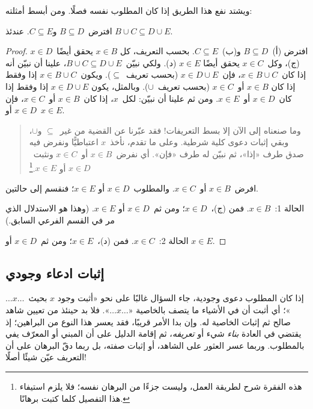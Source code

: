 \documentclass[../../../include/open-logic-section]{subfiles}
\begin{document}
ويشتد نفع هذا الطريق إذا كان المطلوب نفسه فصلًا. ومن أبسط أمثلته:

\begin{prop}
افترض~$B \subseteq D$ و$C \subseteq E$. عندئذ
$B \cup C \subseteq D \cup E$.
\end{prop}

\begin{proof}
  افترض (أ)~$B \subseteq D$ و(ب)~$C \subseteq E$. بحسب التعريف، كل
  $x \in B$ يحقق أيضًا~$x \in D$ (ج)، وكل~$x \in C$ يحقق أيضًا
  $x \in E$ (د). ولكي نبيّن~$B \cup C \subseteq D \cup E$، علينا أن
  نبيّن أنه إذا كان~$x \in B \cup C$، فإن~$x \in D \cup E$ (بحسب
  تعريف~$\subseteq$). ويكون~$x \in B \cup C$ إذا وفقط إذا كان
  $x \in B$ أو~$x \in C$ (بحسب تعريف~$\cup$). وبالمثل، يكون
  $x \in D \cup E$ إذا وفقط إذا كان~$x \in D$ أو~$x \in E$. ومن ثم
  علينا أن نبيّن: لكل~$x$، إذا كان~$x \in B$ أو~$x \in C$، فإن
  $x \in D$ أو~$x \in E$.

  \begin{quote}
  وما صنعناه إلى الآن إلا بسط التعريفات!{} فقد عبّرنا عن القضية من
  غير~$\subseteq$ و$\cup$، وبقي إثبات دعوى كلية شرطية. وعلى ما تقدم،
  نأخذ~$x$ اعتباطيًّا ونفرض فيه صدق طرف «إذا»، ثم نبيّن له طرف «فإن».
  أي نفرض~$x \in B$ أو~$x \in C$ ونثبت~$x \in D$ أو
  $x \in E$.\footnote{هذه الفقرة شرح لطريقة العمل، وليست جزءًا من
  البرهان نفسه؛ فلا يلزم استيفاء هذا التفصيل كلما كتبت برهانًا.}
  \end{quote}

  افرض~$x \in B$ أو~$x \in C$. والمطلوب~$x \in D$ أو
  $x \in E$؛ فنقسم إلى حالتين.

  الحالة 1:~$x \in B$. فمن (ج)،~$x \in D$؛ ومن ثم~$x \in D$ أو
  $x \in E$. (وهذا هو الاستدلال الذي مر في القسم الفرعي السابق.)

  الحالة 2:~$x \in C$. فمن (د)،~$x \in E$؛ ومن ثم~$x \in D$ أو
  $x \in E$.
 \end{proof}


\subsection{إثبات ادعاء وجودي}

إذا كان المطلوب دعوى وجودية، جاء السؤال غالبًا على نحو «أثبت وجود
$x$ بحيث~$\dots x \dots$»؛ أي أثبت أن في الأشياء ما يتصف بالخاصية
«$\dots x \dots$». فلا بد حينئذ من تعيين شاهد صالح ثم إثبات الخاصية
له. وإن بدا الأمر قريبًا، فقد يعسر هذا النوع من البراهين؛ إذ يقتضي
في العادة \emph{بناء} شيء أو \emph{تعريفه}، ثم إقامة الدليل على أن
المبني أو المعرّف يفي بالمطلوب. وربما عسر العثور على الشاهد، أو إثبات
صفته، بل ربما دقّ البرهان على أن التعريف عيّن شيئًا أصلًا!{}
\end{document}
